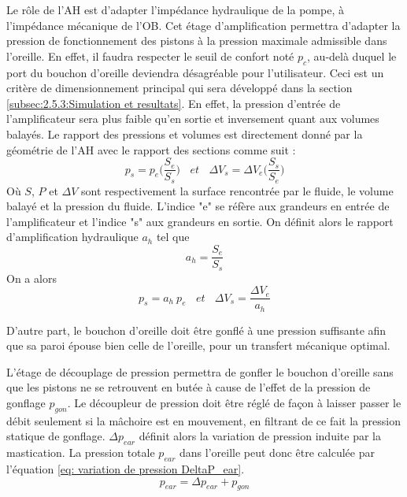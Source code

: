 Le rôle de l'AH est d'adapter l'impédance hydraulique de la pompe, à l'impédance mécanique de l'OB. Cet étage d'amplification permettra d'adapter la pression de fonctionnement des pistons à la pression maximale admissible dans l'oreille. En effet, il faudra respecter le seuil de confort noté $p_c$, au-delà duquel le port du bouchon d'oreille deviendra désagréable pour l'utilisateur. Ceci est un critère de dimensionnement principal qui sera développé dans la section \ref{subsec:2.5.3:Simulation et resultats}. En effet, la pression d'entrée de l'amplificateur sera plus faible qu'en sortie et inversement quant aux volumes balayés. Le rapport des pressions et volumes est directement donné par la géométrie de l'AH avec le rapport des sections comme suit :
\begin{equation}
	p_s = p_e \biggl( \frac{S_e}{S_s} \biggl)
	~~~~et~~~~
	\Delta V_s = \Delta V_e \biggl( \frac{S_s}{S_e} \biggr)
\end{equation}
Où $S$, $P$ et $\Delta V$ sont respectivement la surface rencontrée par le fluide, le volume balayé et la pression du fluide. L'indice "e" se réfère aux grandeurs en entrée de l'amplificateur et l'indice "s" aux grandeurs en sortie. On définit alors le rapport d'amplification hydraulique $a_h$ tel que
\begin{equation}
	a_h = \frac{S_e}{S_s}
\end{equation}
On a alors 
\begin{equation}
	p_s =  a_h\ p_e 
	~~~~et~~~~
	\Delta V_s = \dfrac{\Delta V_e}{a_h}
	\label{eq:volume_sortant_aplificateur_hydraulique}
\end{equation}

D'autre part, le bouchon d'oreille doit être gonflé à une pression suffisante afin que sa paroi épouse bien celle de l'oreille, pour un transfert mécanique optimal.

L'étage de découplage de pression permettra de gonfler le bouchon d'oreille sans que les pistons ne se retrouvent en butée à cause de l'effet de la pression de gonflage $p_{gon}$. Le découpleur de pression doit être réglé de façon à laisser passer le débit seulement si la mâchoire est en mouvement, en filtrant de ce fait la pression statique de gonflage. $\Delta p_{ear}$ définit alors la variation de pression induite par la mastication. La pression totale $p_{ear}$ dans l'oreille peut donc être calculée par l'équation \ref{eq: variation de pression DeltaP_ear}.
\begin{equation}
	 p_{ear} = \Delta p_{ear} +  p_{gon}
	 \label{eq: variation de pression DeltaP_ear}
\end{equation}

